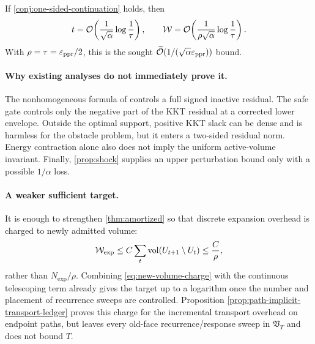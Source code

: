If \cref{conj:one-sided-continuation} holds, then
\begin{equation}
 t=\mathcal{O}\!\left(\frac1{\sqrt\alpha}\log\frac1\tau\right),
 \qquad
 \mathcal W
 =\mathcal{O}\!\left(
   \frac1{\rho\sqrt\alpha}\log\frac1\tau
 \right).
 \label{eq:conditional-final}
\end{equation}
With $\rho=\tau=\varepsilon_{\mathrm{ppr}}/2$, this is the sought
$\widetilde{\mathcal{O}}(1/(\sqrt\alpha\varepsilon_{\mathrm{ppr}}))$ bound.

\paragraph{Why existing analyses do not immediately prove it.}
The nonhomogeneous \LOCCH{} formula of \citet{zhou2024} controls a full signed
inactive residual.  The safe gate controls only the negative part of the KKT
residual at a corrected lower envelope.  Outside the optimal support, positive
KKT slack can be dense and is harmless for the obstacle problem, but it enters
a two-sided residual norm.  Energy contraction alone also does not imply the
uniform active-volume invariant.  Finally, \cref{prop:shock} supplies an
upper perturbation bound only with a possible $1/\alpha$ loss.

\paragraph{A weaker sufficient target.}
It is enough to strengthen \cref{thm:amortized} so that discrete expansion
overhead is charged to newly admitted volume:
\begin{equation}
  \mathcal W_{\mathrm{exp}}
  \leq C\sum_t\operatorname{vol}(U_{t+1}\setminus U_t)
  \leq\frac{C}{\rho},
  \label{eq:new-volume-charge}
\end{equation}
rather than $N_{\mathrm{exp}}/\rho$.  Combining
\cref{eq:new-volume-charge} with the continuous telescoping term already gives
the target up to a logarithm once the number and placement of recurrence
sweeps are controlled.  Proposition
\cref{prop:path-implicit-transport-ledger} proves this charge for the
incremental transport overhead on endpoint paths, but leaves every old-face
recurrence/response sweep in $\mathfrak V_T$ and does not bound $T$.
